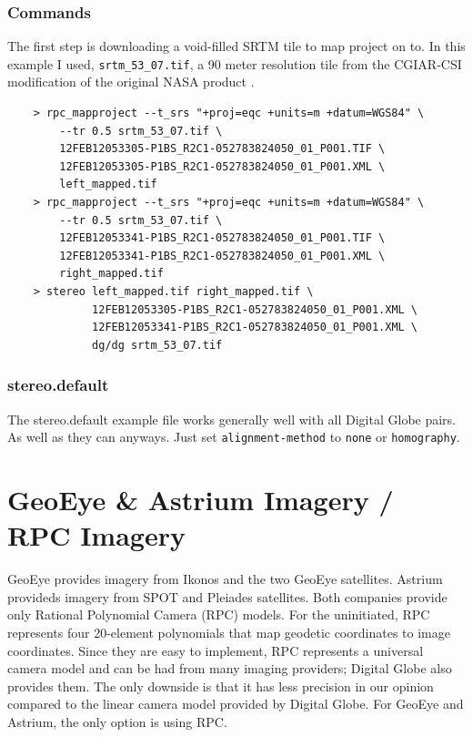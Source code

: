 \subsubsection*{Commands}

The first step is downloading a void-filled SRTM tile to map project
on to. In this example I used, \texttt{srtm\_53\_07.tif}, a 90 meter
resolution tile from the CGIAR-CSI modification of the original NASA
product \cite{cgiar:srtm90m}.

\begin{verbatim}
    > rpc_mapproject --t_srs "+proj=eqc +units=m +datum=WGS84" \
        --tr 0.5 srtm_53_07.tif \
        12FEB12053305-P1BS_R2C1-052783824050_01_P001.TIF \
        12FEB12053305-P1BS_R2C1-052783824050_01_P001.XML \
        left_mapped.tif
    > rpc_mapproject --t_srs "+proj=eqc +units=m +datum=WGS84" \
        --tr 0.5 srtm_53_07.tif \
        12FEB12053341-P1BS_R2C1-052783824050_01_P001.TIF \
        12FEB12053341-P1BS_R2C1-052783824050_01_P001.XML \
        right_mapped.tif
    > stereo left_mapped.tif right_mapped.tif \
             12FEB12053305-P1BS_R2C1-052783824050_01_P001.XML \
             12FEB12053341-P1BS_R2C1-052783824050_01_P001.XML \
             dg/dg srtm_53_07.tif
\end{verbatim}

\subsubsection*{stereo.default}

The stereo.default example file works generally well with all Digital
Globe pairs. As well as they can anyways. Just set
\texttt{alignment-method} to \texttt{none} or \texttt{homography}.

\newpage
\section{GeoEye \& Astrium Imagery / RPC Imagery}
\label{rpc}

GeoEye provides imagery from Ikonos and the two GeoEye
satellites. Astrium provideds imagery from SPOT and Pleiades
satellites. Both companies provide only Rational Polynomial Camera
(RPC) models. For the uninitiated, RPC represents four 20-element
polynomials that map geodetic coordinates to image coordinates. Since
they are easy to implement, RPC represents a universal camera model
and can be had from many imaging providers; Digital Globe also
provides them. The only downside is that it has less precision in our
opinion compared to the linear camera model provided by Digital
Globe. For GeoEye and Astrium, the only option is using RPC.

